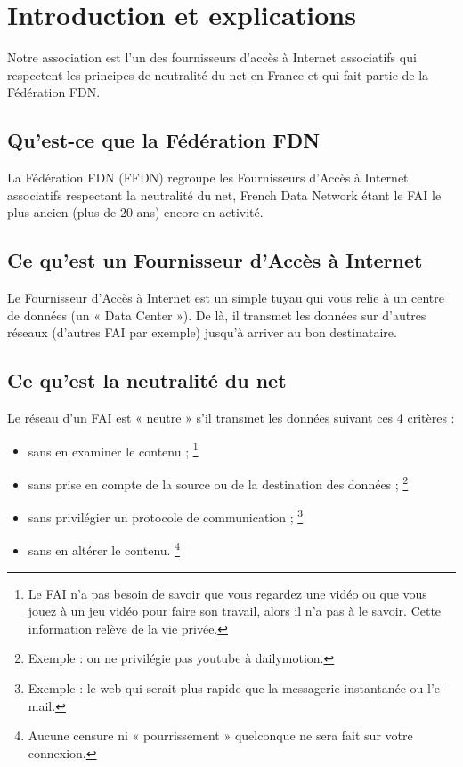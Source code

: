 \section{Introduction et explications}
Notre association est l'un des fournisseurs d'accès à Internet associatifs qui 
respectent les principes de neutralité du net en France et 
qui fait partie de la Fédération FDN.

\subsection{Qu'est-ce que la Fédération FDN}
La Fédération FDN (FFDN) regroupe les Fournisseurs d'Accès à Internet 
associatifs respectant la neutralité du net,
French Data Network étant le FAI le plus ancien (plus de 20 ans) encore en activité.

\subsection{Ce qu'est un Fournisseur d'Accès à Internet}
Le Fournisseur d'Accès à Internet est un simple tuyau qui vous relie à un 
centre de données (un « Data Center »). 
De là, il transmet les données sur d'autres réseaux (d'autres FAI par exemple) 
jusqu'à arriver au bon destinataire.

\subsection{Ce qu'est la neutralité du net}
Le réseau d'un FAI est « neutre » s'il transmet les données suivant ces 4 critères :

\begin{itemize}
\item sans en examiner le contenu ;
\protect\footnote{
	Le FAI n'a pas besoin de savoir que vous regardez une vidéo ou que vous jouez 
		à un jeu vidéo pour faire son travail, alors il n'a pas à le savoir.
	Cette information relève de la vie privée.
}
\item sans prise en compte de la source ou de la destination des données ;
\protect\footnote{
	Exemple : on ne privilégie pas youtube à dailymotion.
}
\item sans privilégier un protocole de communication ;
\protect\footnote{
	Exemple : le web qui serait plus rapide que la messagerie instantanée ou l'e-mail.
}
\item sans en altérer le contenu.
\protect\footnote{
	Aucune censure ni « pourrissement » quelconque ne sera fait sur votre connexion.
}
\end{itemize}

